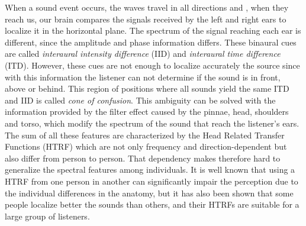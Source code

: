 \documentclass[journal]{IEEEtran}
\begin{document}
When a sound event   occurs,   the   waves   travel   in   all directions and ,  when  they  reach  us,  our  brain  compares  the signals  received  by  the  left  and  right  ears  to  localize  it in the horizontal plane.  The spectrum of the signal reaching each ear is different, since the amplitude and phase information differs. These binaural cues are  called  \emph{interaural  intensity  difference}  (IID)  and  \emph{interaural time  difference}  (ITD). However, these cues are not enough to localize accurately the source since with this information the listener can not determine if the sound is in front, above or behind. This region of positions where all sounds yield the same ITD and IID is called \textit{cone of confusion}.
This ambiguity can be solved with the information provided by the filter effect caused by the pinnae, head, shoulders and torso, which modify the spectrum of the sound that reach the listener's ears. The sum of all these features are characterized by the Head Related Transfer Functions (HTRF) which are not only frequency and direction-dependent but also differ from person to person. That dependency makes therefore hard to generalize the spectral features among individuals. It is well known that using a HTRF from one person in another can significantly impair the  perception due to the individual differences in the anatomy, but it has also been shown that some people localize better the sounds than others, and their HTRFs are suitable for a large group of listeners.

\end{document}
